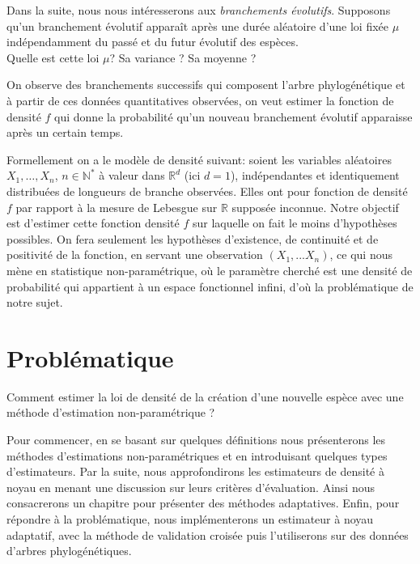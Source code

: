 \documentclass[
]{book}
\begin{document}
\hspace*{0.5cm}
Dans la suite, nous nous intéresserons aux \emph{branchements évolutifs}.
Supposons qu'un branchement évolutif apparaît après une durée aléatoire d'une loi fixée \(\mu\) indépendamment du passé et du futur évolutif des espèces.\\
Quelle est cette loi \(\mu\)? Sa variance ? Sa moyenne ? \newline

\hspace*{0.5cm}

On observe des branchements successifs qui composent l'arbre
phylogénétique et à partir de ces données quantitatives observées, on
veut estimer la fonction de densité \(f\) qui donne la probabilité
qu'un nouveau branchement évolutif apparaisse après un certain temps.

\hspace*{0.5cm}
Formellement on a le modèle de densité suivant: soient les variables aléatoires \(X_1,\dots,X_n\), \(n \in \mathbb{N^*}\) à valeur dans \(\mathbb{R}^d\) (ici \(d=1\)), indépendantes et identiquement distribuées de longueurs de branche observées. Elles ont pour fonction de densité \(f\) par rapport à la mesure de Lebesgue sur \(\mathbb{R}\) supposée inconnue. Notre objectif est d'estimer cette fonction densité \(f\) sur laquelle on fait le moins d'hypothèses possibles. On fera seulement les hypothèses d'existence, de continuité et de positivité de la fonction, en servant une observation \((X_1,...X_n)\), ce qui nous mène en statistique non-paramétrique, où le paramètre cherché est une densité de probabilité qui appartient à un espace fonctionnel infini, d'où la problématique de notre sujet.

\hypertarget{probluxe9matique}{%
\section{Problématique}\label{probluxe9matique}}

Comment estimer la loi de densité de la création d'une nouvelle espèce
avec une méthode d'estimation non-paramétrique ?

\hspace*{0.5cm} Pour commencer, en se basant sur quelques définitions nous présenterons les méthodes d'estimations non-paramétriques et en introduisant quelques types d'estimateurs.\newline
Par la suite, nous approfondirons les estimateurs de densité à noyau en menant une discussion sur leurs critères d'évaluation. Ainsi nous consacrerons un chapitre pour présenter des méthodes adaptatives.\newline
Enfin, pour répondre à la problématique, nous implémenterons un estimateur à noyau adaptatif, avec la méthode de validation croisée puis l'utiliserons sur des données d'arbres phylogénétiques.
\end{document}
